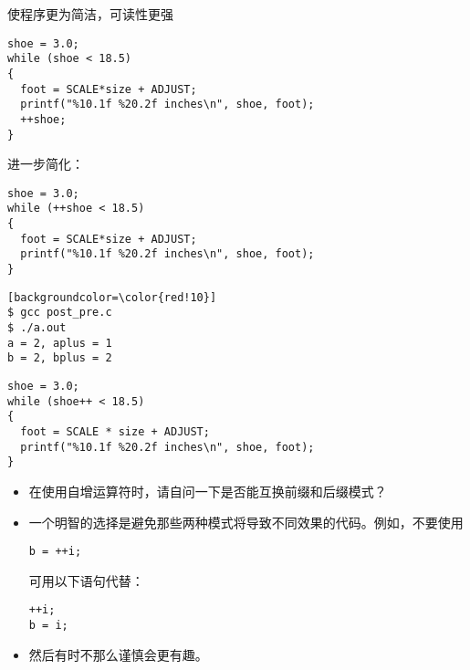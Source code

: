 \begin{frame}[fragile]

使程序更为简洁，可读性更强

\begin{lstlisting}[backgroundcolor=\color{red!10}]
shoe = 3.0;
while (shoe < 18.5)
{
  foot = SCALE*size + ADJUST;
  printf("%10.1f %20.2f inches\n", shoe, foot);
  ++shoe;
}
\end{lstlisting}
\end{frame}

\begin{frame}[fragile]
进一步简化：
\begin{lstlisting}[backgroundcolor=\color{red!10}]
shoe = 3.0;
while (++shoe < 18.5)
{
  foot = SCALE*size + ADJUST;
  printf("%10.1f %20.2f inches\n", shoe, foot);
}
\end{lstlisting}
\end{frame}

\begin{frame}[fragile]
    
\end{frame}

\begin{frame}[fragile]
  \begin{lstlisting}[backgroundcolor=\color{red!10}][backgroundcolor=\color{red!10}]
$ gcc post_pre.c
$ ./a.out    
a = 2, aplus = 1
b = 2, bplus = 2
\end{lstlisting}    
\end{frame}



\begin{frame}[fragile]
\begin{lstlisting}[backgroundcolor=\color{red!10}]
shoe = 3.0;
while (shoe++ < 18.5)
{
  foot = SCALE * size + ADJUST;
  printf("%10.1f %20.2f inches\n", shoe, foot);
}
\end{lstlisting}
\end{frame}

\begin{frame}[fragile]
\begin{itemize}
\item
在使用自增运算符时，请自问一下是否能互换前缀和后缀模式？\\[0.1in]
\item
一个明智的选择是避免那些两种模式将导致不同效果的代码。例如，不要使用
\begin{lstlisting}[backgroundcolor=\color{red!10}]
b = ++i;
\end{lstlisting}
可用以下语句代替：
\begin{lstlisting}[backgroundcolor=\color{red!10}]
++i;
b = i;
\end{lstlisting}
\item 然后有时不那么谨慎会更有趣。
\end{itemize}
\end{frame}

